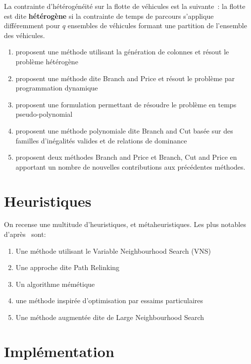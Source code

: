 \documentclass[a4paper]{scrartcl}
\begin{document}
La contrainte d'hétérogénéité sur la flotte de véhicules est la suivante~: la
flotte est dite \textbf{hétérogène} si la contrainte de temps de parcours
s'applique différemment pour $q$ ensembles de véhicules formant une partition
de l'ensemble des véhicules.

\begin{enumerate}
	\item \cite{butt.ryan_apr1999} proposent une méthode utilisant la génération
		de colonnes et résout le problème hétérogène
	\item \cite{boussier.etal_sep2007} proposent une méthode dite
		\foreignlanguage{UKenglish}{Branch and Price} et résout le
		problème par programmation dynamique
	\item \cite{poggi.etal_2010} proposent une formulation permettant de
		résoudre le problème en temps pseudo-polynomial
	\item \cite{dang.etal_may2013} proposent une méthode polynomiale dite
		\foreignlanguage{UKenglish}{Branch and Cut} basée sur des
		familles d'inégalités valides et de relations de dominance 
	\item \cite{keshtkaran.etal_jan2016} proposent deux méthodes
		\foreignlanguage{UKenglish}{Branch and Price} et
		\foreignlanguage{UKenglish}{Branch, Cut and Price} en apportant
		un nombre de nouvelles contributions aux précédentes méthodes.
\end{enumerate}

\section{Heuristiques}%
\label{sec:heuristiques}

On recense une multitude d'heuristiques, et métaheuristiques. Les plus notables d'après~\cite{keshtkaran.etal_jan2016} sont:

\begin{enumerate}
	\item Une méthode utilisant le \foreignlanguage{UKenglish}{Variable
		Neighbourhood Search} (VNS)~\cite{archetti.etal_feb2007}
	\item Une approche dite \foreignlanguage{UKenglish}{Path
		Relinking}~\cite{souffriau.etal_nov2010}
	\item Un algorithme mémétique~\cite{bouly.etal_mar2010,dang.etal_2011}
	\item une méthode inspirée d'optimisation par essaims
		particulaires~\cite{dang.etal_sep2013}
	\item Une méthode augmentée dite de \foreignlanguage{UKenglish}{Large
		Neighbourhood Search}~\cite{kim.etal_jun2013}
\end{enumerate}

\section{Implémentation}
\label{sec:implementation}

\printnoidxglossary[type=acronym]
\printbibliography
\end{document}
